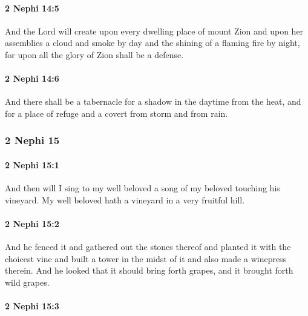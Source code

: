 		\paragraph{2 Nephi 14:5} %
			\label{2NEPHI-14-5}

			And the Lord will create
			upon every dwelling place of mount Zion
			and upon her assemblies
			a cloud and smoke by day
			and the shining of a flaming fire by night,
			for upon all the glory of Zion shall be a defense.

		\paragraph{2 Nephi 14:6} %
			\label{2NEPHI-14-6}

			And there shall be a tabernacle
			for a shadow in the daytime from the heat,
			and for a place of refuge and a covert from storm and from rain.

	\subsubsection{2 Nephi 15} %
		\label{2NEPHI-15}
		
		\paragraph{2 Nephi 15:1} %
			\label{2NEPHI-15-1}

			And then will I sing to my well beloved
			a song of my beloved touching his vineyard.
			My well beloved hath a vineyard in a very fruitful hill.

		\paragraph{2 Nephi 15:2} %
			\label{2NEPHI-15-2}

			And he fenced it and gathered out the stones thereof
			and planted it with the choicest vine
			and built a tower in the midst of it
			and also made a winepress therein.
			And he looked that it should bring forth grapes,
			and it brought forth wild grapes.

		\paragraph{2 Nephi 15:3} %
			\label{2NEPHI-15-3}


